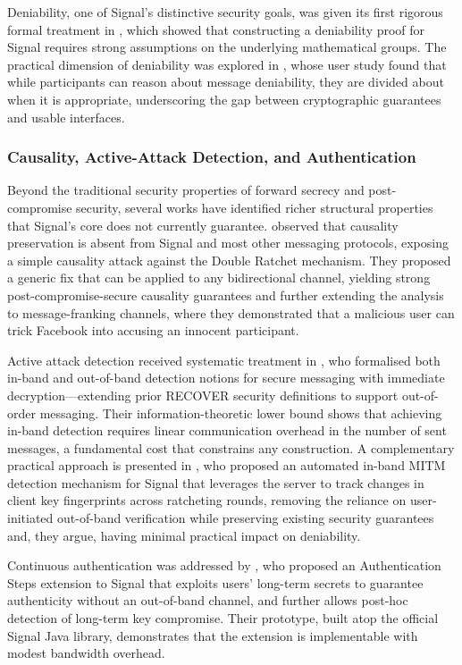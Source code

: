 Deniability, one of Signal's distinctive security goals, was given its first rigorous formal treatment in \textcite{vatandas2020}, which showed that constructing a deniability proof for Signal requires strong assumptions on the underlying mathematical groups. The practical dimension of deniability was explored in \textcite{rajendran2024}, whose user study found that while participants can reason about message deniability, they are divided about when it is appropriate, underscoring the gap between cryptographic guarantees and usable interfaces.

\subsubsection{Causality, Active-Attack Detection, and Authentication}

Beyond the traditional security properties of forward secrecy and post-compromise security, several works have identified richer structural properties that Signal's core does not currently guarantee. \textcite{chen2024} observed that causality preservation is absent from Signal and most other messaging protocols, exposing a simple causality attack against the Double Ratchet mechanism. They proposed a generic fix that can be applied to any bidirectional channel, yielding strong post-compromise-secure causality guarantees and further extending the analysis to message-franking channels, where they demonstrated that a malicious user can trick Facebook into accusing an innocent participant.

Active attack detection received systematic treatment in \textcite{barooti2023}, who formalised both in-band and out-of-band detection notions for secure messaging with immediate decryption—extending prior RECOVER security definitions to support out-of-order messaging. Their information-theoretic lower bound shows that achieving in-band detection requires linear communication overhead in the number of sent messages, a fundamental cost that constrains any construction. A complementary practical approach is presented in \textcite{teng2024}, who proposed an automated in-band MITM detection mechanism for Signal that leverages the server to track changes in client key fingerprints across ratcheting rounds, removing the reliance on user-initiated out-of-band verification while preserving existing security guarantees and, they argue, having minimal practical impact on deniability.

Continuous authentication was addressed by \textcite{dowling2022}, who proposed an Authentication Steps extension to Signal that exploits users' long-term secrets to guarantee authenticity without an out-of-band channel, and further allows post-hoc detection of long-term key compromise. Their prototype, built atop the official Signal Java library, demonstrates that the extension is implementable with modest bandwidth overhead.

